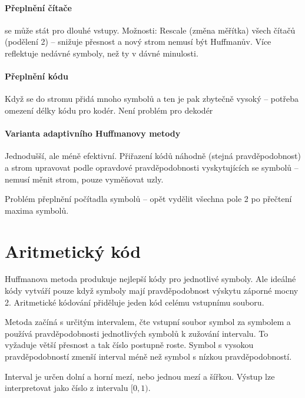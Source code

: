 \documentclass[a4paper, 11pt]{report}
\begin{document}
\paragraph{Přeplnění čítače} se může stát pro dlouhé vstupy. Možnosti: Rescale (změna měřítka) všech čítačů (podělení 2) -- snižuje přesnost a nový strom nemusí být Huffmanův. Více reflektuje nedávné symboly, než ty v dávné minulosti.

\paragraph{Přeplnění kódu}
Když se do stromu přidá mnoho symbolů a ten je pak zbytečně vysoký -- potřeba omezení délky kódu pro kodér. Není problém pro dekodér

\paragraph{Varianta adaptivního Huffmanovy metody}
Jednodušší, ale méně efektivní. Přiřazení kódů náhodně (stejná pravděpodobnost) a strom upravovat podle opravdové pravděpodobnosti vyskytujících se symbolů -- nemusí měnit strom, pouze vyměňovat uzly.

Problém přeplnění počítadla symbolů -- opět vydělit všechna pole 2 po přečtení maxima symbolů.

\section{Aritmetický kód}
Huffmanova metoda produkuje nejlepší kódy pro jednotlivé symboly. Ale ideálné kódy vytváří pouze když symboly mají pravděpodobnost výskytu záporné mocny 2. Aritmetické kódování přiděluje jeden kód celému vstupnímu souboru.

Metoda začíná s určitým intervalem, čte vstupní soubor symbol za symbolem a používá pravděpodobnosti jednotlivých symbolů k zužování intervalu. To vyžaduje větší přesnost a tak číslo postupně roste. Symbol s vysokou pravděpodobností zmenší interval méně než symbol s nízkou pravděpodobností.

Interval je určen dolní a horní mezí, nebo jednou mezí a šířkou. Výstup lze interpretovat jako číslo z intervalu $[0, 1)$.
\end{document}
